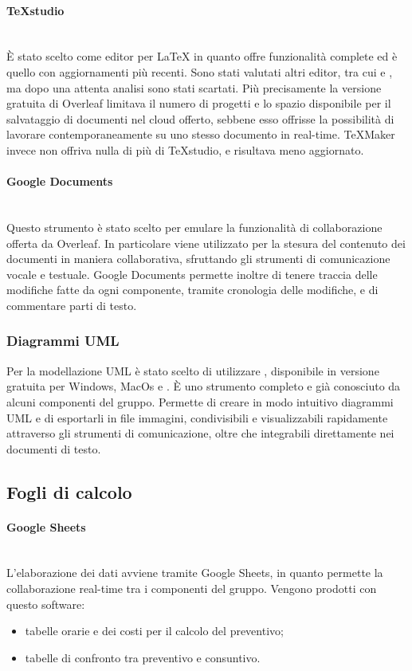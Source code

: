 \paragraph{TeXstudio}\mbox{}\\
\`{E} stato scelto  come editor per \LaTeX{} in quanto offre funzionalità complete ed è quello con aggiornamenti più recenti. Sono stati valutati altri editor, tra cui  e , ma dopo una attenta analisi sono stati scartati. Più precisamente la versione gratuita di Overleaf limitava il numero di progetti e lo spazio disponibile per il salvataggio di documenti nel cloud offerto, sebbene esso offrisse la possibilità di lavorare contemporaneamente su uno stesso documento in real-time. TeXMaker invece non offriva nulla di più di TeXstudio, e risultava meno aggiornato.

\paragraph{Google Documents}\mbox{}\\
Questo strumento è stato scelto per emulare la funzionalità di collaborazione offerta da Overleaf. In particolare viene utilizzato per la stesura del contenuto dei documenti in maniera collaborativa, sfruttando gli strumenti di comunicazione vocale e testuale. Google Documents permette inoltre di tenere traccia delle modifiche fatte da ogni componente, tramite cronologia delle modifiche, e di commentare parti di testo. 

\subsubsection{Diagrammi UML}
Per la modellazione UML è stato scelto di utilizzare \textbf{}, disponibile in versione gratuita per Windows, MacOs e . \`{E} uno strumento completo e già conosciuto da alcuni componenti del gruppo. Permette di creare in modo intuitivo diagrammi UML e di esportarli in file immagini, condivisibili e visualizzabili rapidamente attraverso gli strumenti di comunicazione, oltre che integrabili direttamente nei documenti di testo.

\subsection{Fogli di calcolo} \label{sec:fogli_di_calcolo}
\paragraph{Google Sheets}\mbox{}\\
L'elaborazione dei dati avviene tramite Google Sheets, in quanto permette la collaborazione real-time tra i componenti del gruppo. Vengono prodotti con questo software:
	\begin{itemize}
	\item tabelle orarie e dei costi per il calcolo del preventivo;
	\item tabelle di confronto tra preventivo e consuntivo.
	\end{itemize}

